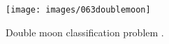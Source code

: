 \begin{figure}[!h]
\centering
\texttt{[image: images/063doublemoon]}
\caption[Double moon classification problem]{Double moon classification
problem \cite{RefWorks:158}.}
\label{fig:063doublemoon}
\end{figure}